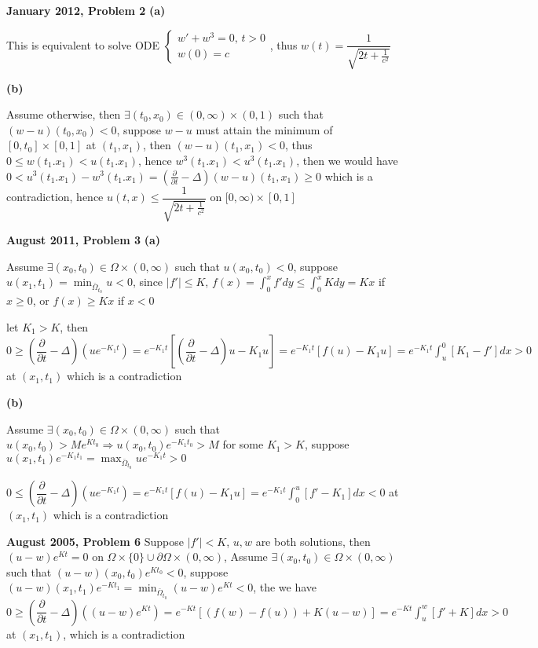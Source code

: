 \documentclass[../main.tex]{subfiles}
\begin{document}
\begin{customproblem}\textbf{January 2012, Problem 2}
\textbf{(a)} \par
This is equivalent to solve ODE $
\left\{\begin{matrix}
w'+w^{3}=0,\,t>0\\ 
w(0)=c
\end{matrix}\right.
$, thus $w(t)=\dfrac{1}{\sqrt{2t+\frac{1}{c^{2}}}}$ \par
\textbf{(b)} \par
Assume otherwise, then $\exists (t_0,x_0)\in (0,\infty)\times (0,1)$ such that $(w-u)(t_0,x_0)<0$, suppose $w-u$ must attain the minimum of $[0,t_0]\times [0,1]$ at $(t_1,x_1)$, then $(w-u)(t_1,x_1)<0$, thus $0\leq w(t_1.x_1)<u(t_1.x_1)$, hence $w^3(t_1.x_1)<u^3(t_1.x_1)$, then we would have $0<u^3(t_1.x_1)-w^3(t_1.x_1)=(\frac{\partial}{\partial t}-\Delta)(w-u)(t_1,x_1)\geq 0$ which is a contradiction, hence $u(t,x)\leq \dfrac{1}{\sqrt{2t+\frac{1}{c^{2}}}}$ on $[0,\infty)\times[0,1]$
\end{customproblem}

\begin{customproblem}\textbf{August 2011, Problem 3}
\textbf{(a)} \par
Assume $\exists (x_0,t_0)\in\Omega\times(0,\infty)$ such that $u(x_0,t_0)<0$, suppose $u(x_1,t_1)=\min_{\bar{\Omega}_{t_0}}u<0$, since $|f'|\leq K$, $\displaystyle f(x)=\int_0^xf'dy\leq\int_0^xKdy=Kx$ if $x\geq0$, or $f(x)\geq Kx$ if $x<0$ \par
let $K_1>K$, then $
0\geq\left(\dfrac{\partial}{\partial t}-\Delta\right)\left(ue^{-K_1t}\right)
=e^{-K_1t}\left[\left(\dfrac{\partial}{\partial t}-\Delta\right)u-K_1u\right] 
=e^{-K_1t}\left[f(u)-K_1u\right]
=e^{-K_1t}\displaystyle\int_u^0\left[K_1-f'\right]dx>0$ at $(x_1,t_1)$ which is a contradiction \par
\textbf{(b)} \par
Assume $\exists (x_0,t_0)\in\Omega\times(0,\infty)$ such that $u(x_0,t_0)>Me^{Kt_0}\Rightarrow u(x_0,t_0)e^{-K_1t_0}>M$ for some $K_1>K$, suppose $u(x_1,t_1)e^{-K_1t_1}=\max_{\bar{\Omega}_{t_0}}ue^{-K_1t}>0$ \par
$0\leq\left(\dfrac{\partial}{\partial t}-\Delta\right)\left(ue^{-K_1t}\right)
=e^{-K_1t}\left[f(u)-K_1u\right]=e^{-K_1t}\displaystyle\int_0^u\left[f'-K_1\right]dx<0 $ at $(x_1,t_1)$ which is a contradiction
\end{customproblem}

\begin{customproblem}\textbf{August 2005, Problem 6}
Suppose $|f'|<K$, $u,w$ are both solutions, then $(u-w)e^{Kt}=0$ on $\Omega\times\{0\}\cup\partial\Omega\times(0,\infty)$, Assume $\exists (x_0,t_0)\in\Omega\times(0,\infty)$ such that $(u-w)(x_0,t_0)e^{Kt_0}<0$, suppose $(u-w)(x_1,t_1)e^{-Kt_1}=\min_{\bar{\Omega}_{t_0}}(u-w)e^{Kt}<0$, the we have
 $
0\geq\left(\dfrac{\partial}{\partial t}-\Delta\right)\left((u-w)e^{Kt}\right)
=e^{-Kt}\left[\left(f(w)-f(u)\right)+K(u-w)\right]
=e^{-Kt}\displaystyle\int_u^w\left[f'+K\right]dx>0 $ at $(x_1,t_1)$, which is a contradiction

\end{customproblem}
\end{document}
